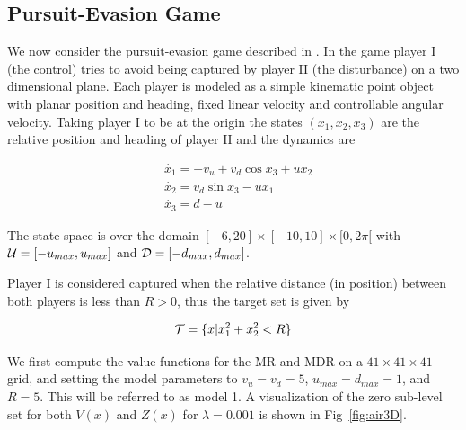 \subsection{Pursuit-Evasion Game}

We now consider the pursuit-evasion game described in \cite{Mitchell2005}. In the game player I (the control) tries to avoid being captured by player II (the disturbance) on a two dimensional plane. Each player is modeled as a simple kinematic point object with planar position and heading, fixed linear velocity and controllable angular velocity. Taking player I to be at the origin the states $(x_1, x_2, x_3)$ are the relative position and heading of player II and the dynamics are

\begin{equation}
\begin{split}
&\dot{x_1}= -v_u+v_d \cos x_3 + ux_2\\ 
&\dot{x_2}= v_d \sin x_3 - ux_1\\ 
&\dot{x_3}= d-u
\end{split}
\end{equation}

The state space is over the domain $[-6,20] \times [-10,10] \times [0,2\pi[$ with $\mathcal{U}=[-u_{max},u_{max}]$ and $\mathcal{D}=[-d_{max}, d_{max}]$. 

Player I is considered captured when the relative distance (in position) between both players is less than $R>0$, thus the target set is given by

\begin{equation}
\mathcal{T}= \{x| x_1^{2}+x_2^2 < R\}
\end{equation}


We first compute the value functions for the MR and MDR on a $41 \times 41 \times 41$ grid, and setting the model parameters to $v_u=v_d=5$, $u_{max}=d_{max}=1$, and $R=5$. This will be referred to as model 1. A visualization of the zero sub-level set for both $V(x)$ and $Z(x)$ for $\lambda=0.001$ is shown in Fig~\ref{fig:air3D}.


